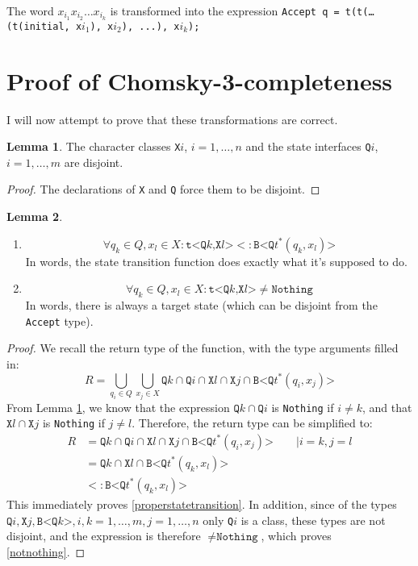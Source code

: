 \documentclass[a4paper, 11pt]{article}
\newcommand{\code}[1]{\texttt{#1}}
\theoremstyle{definition}
\newtheorem{lemma}{Lemma}
\begin{document}
The word $x_{i_1}x_{i_2}\ldots x_{i_k}$ is transformed into the expression
\code{Accept q = t(t(\ldots (t(initial, x$i_1$), x$i_2$), ...), x$i_k$);}

\section{Proof of Chomsky-3-completeness}

I will now attempt to prove that these transformations are correct.

\begin{lemma}\label{disjoint}
The character classes \code{X$i$}, $i=1,\ldots,n$ and the state interfaces \code{Q$i$}, $i=1,\ldots,m$ are disjoint.
\begin{proof}
The declarations of \code{X} and \code{Q} force them to be disjoint.
\end{proof}
\end{lemma}

\begin{lemma}\label{singlestatetransition}
\begin{enumerate}
\item\label{properstatetransition} \[\forall q_k\in Q, x_l\in X: \code{t<Q}k\code{,X}l\code{>} <: \code{B<Q}t^\ast(q_k, x_l)\code{>}\]
In words, the state transition function does exactly what it’s supposed to do.
\item\label{notnothing} \[\forall q_k\in Q, x_l\in X: \code{t<Q}k\code{,X}l\code{>} \neq \code{Nothing}\]
In words, there is always a target state (which can be disjoint from the \code{Accept} type).
\end{enumerate}

\begin{proof}
We recall the return type of the function, with the type arguments filled in:
\[
R = \bigcup\limits_{q_i\in Q}\bigcup\limits_{x_j\in X} \code{Q}k\cap\code{Q}i \cap \code{X}l\cap\code{X}j \cap \code{B<Q}t^\ast(q_i, x_j)\code{>}
\]
From Lemma \ref{disjoint}, we know that the expression $\code{Q}k\cap\code{Q}i$ is \code{Nothing} if $i\neq k$, and that $\code{X}l\cap\code{X}j$ is \code{Nothing} if $j\neq l$. Therefore, the return type can be simplified to:
\begin{align*}
R &= \code{Q}k\cap\code{Q}i \cap \code{X}l\cap\code{X}j \cap \code{B<Q}t^\ast(q_i, x_j)\code{>} \qquad | i=k, j=l\\
  &= \code{Q}k \cap \code{X}l \cap \code{B<Q}t^\ast(q_k, x_l)\code{>}\\
  &<: \code{B<Q}t^\ast(q_k, x_l)\code{>}
\end{align*}
This immediately proves \ref{properstatetransition}. In addition, since of the types $\code{Q}i,\code{X}j,\code{B<Q}k\code{>},i,k=1,\ldots,m,j=1,\ldots,n$ only \code{Q$i$} is a class, these types are not disjoint, and the expression is therefore $\neq \code{Nothing}$, which proves \ref{notnothing}.
\end{proof}
\end{lemma}
\end{document}
